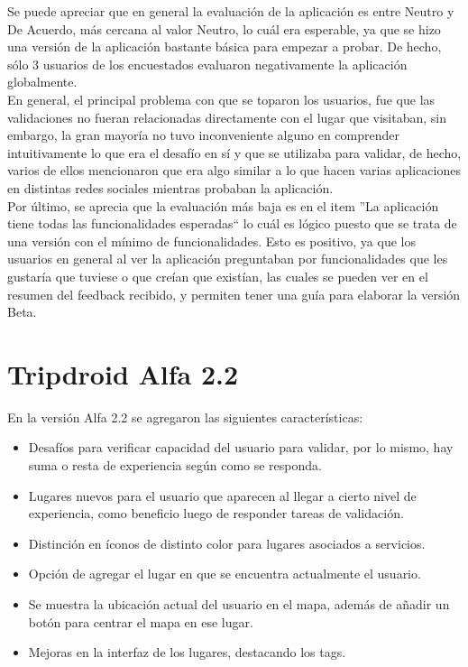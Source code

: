 \documentclass[10pt,letterpaper]{article}
\begin{document}
Se puede apreciar que en general la evaluación de la aplicación es entre Neutro y De Acuerdo, más cercana al valor Neutro, lo cuál era esperable, ya que se hizo una versión de la aplicación bastante básica para empezar a probar. De hecho, sólo 3 usuarios de los encuestados evaluaron negativamente la aplicación globalmente.\\

En general, el principal problema con que se toparon los usuarios, fue que las validaciones no fueran relacionadas directamente con el lugar que visitaban, sin embargo, la gran mayoría no tuvo inconveniente alguno en comprender intuitivamente lo que era el desafío en sí y que se utilizaba para validar, de hecho, varios de ellos mencionaron que era algo similar a lo que hacen varias aplicaciones en distintas redes sociales mientras probaban la aplicación.\\

Por último, se aprecia que la evaluación más baja es en el item ''La aplicación tiene todas las funcionalidades esperadas`` lo cuál es lógico puesto que se trata de una versión con el mínimo de funcionalidades. Esto es positivo, ya que los usuarios en general al ver la aplicación preguntaban por funcionalidades que les gustaría que tuviese o que creían que existían, las cuales se pueden ver en el resumen del feedback recibido, y permiten tener una guía para elaborar la versión Beta.\\

\newpage
\section{Tripdroid Alfa 2.2}

En la versión Alfa 2.2 se agregaron las siguientes características:\\

\begin{itemize}
 \item Desafíos para verificar capacidad del usuario para validar, por lo mismo, hay suma o resta de experiencia según como se responda.
 \item Lugares nuevos para el usuario que aparecen al llegar a cierto nivel de experiencia, como beneficio luego de responder tareas de validación.
 \item Distinción en íconos de distinto color para lugares asociados a servicios.
 \item Opción de agregar el lugar en que se encuentra actualmente el usuario.
 \item Se muestra la ubicación actual del usuario en el mapa, además de añadir un botón para centrar el mapa en ese lugar.
 \item Mejoras en la interfaz de los lugares, destacando los tags.
\end{itemize}
\end{document}
